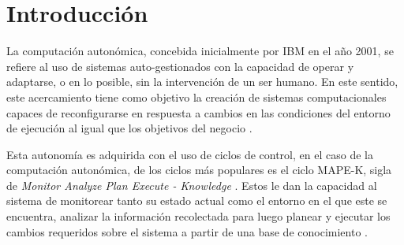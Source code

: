 \documentclass[12pt]{article}
\begin{document}
    
    
    \section{Introducción}


    La computación autonómica, concebida inicialmente por IBM en el año 2001, se refiere al uso de sistemas auto-gestionados con la capacidad de operar y adaptarse, o en lo posible, sin la intervención de un ser humano. En este sentido, este acercamiento tiene como objetivo la creación de sistemas computacionales capaces de reconfigurarse en respuesta a cambios en las condiciones del entorno de ejecución al igual que los objetivos del negocio \cite{horn_2001}.

    Esta autonomía es adquirida con el uso de ciclos de control, en el caso de la computación autonómica, de los ciclos más populares es el ciclo MAPE-K, sigla de \textit{Monitor Analyze Plan Execute - Knowledge} \cite{Arcaini_2015}. Estos le dan la capacidad al sistema de monitorear tanto su estado actual como el entorno en el que este se encuentra, analizar la información recolectada para luego planear y ejecutar los cambios requeridos sobre el sistema a partir de una base de conocimiento \cite{RutanenKalle2018McoO}.
    

\end{document}
